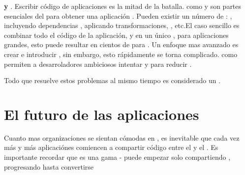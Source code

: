 \begin{itemize}
		\textbf{\buildingPL y \packagingCPT}. Escribir código de aplicaciones \isomorphicAS es la mitad de la batalla. \toolsCPT como \grunttoolNAME y \browserifyNAME son partes esenciales del \workflowCPT para obtener una aplicación \runningCPT. Pueden existir un número de \buildStepsPL: \compilingPL \templatesAS, incluyendo dependencias \clientSideAS, aplicando transformaciones, \minificationPL, etc.El caso sencillo es combinar todo el código de la aplicación, \viewsAS y \templatesAS en un único \bundleCPT, para aplicaciones grandes, esto puede resultar en cientos de \kilobytesPC para \downloadCPT. Un enfoque mas avanzado es crear \dynamicBundlesCPT e introducir \lazyLoadingCPT \assetsAS, sin embargo, esto rápidamente se torna complicado. \toolsCPT \statAnalyCPT como \esprimaNAME permiten a desarroladores ambiciosos intentar \optimizationQA y \metaprogrammingPC para reducir \boilerplateCodeAS.
\end{itemize}

Todo \frameworkPC que resuelve estos problemas al mismo tiempo es considerado un \isomorphicAS \javaScriptNAME \frameworksPC. 


\section{El futuro de las aplicaciones \webINT}

Cuanto mas organizaciones se sientan cómodas \runningCPT \nodejsNAME en \productionPC, es inevitable que cada vez más y más aplicaciónes \webINT comiencen a compartir código entre el \clientAS y el \serverAS. Es importante recordar que \isomorphicAS \javaScriptNAME es una gama - puede empezar solo compartiendo \templatesAS, progresando hasta convertirse 

